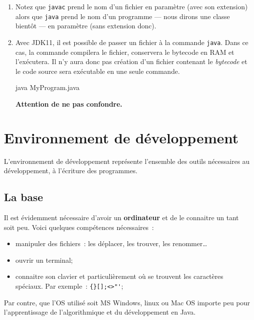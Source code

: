 \begin{enumerate}
	
	\item Notez que \texttt{javac} prend le nom d'un fichier en paramètre (avec
		son extension) alors que \texttt{java} prend le nom d'un programme
		— nous dirons une classe bientôt — en paramètre (sans extension donc). 

	\item Avec JDK11, il est possible de passer un fichier à la commande
		\texttt{java}. Dans ce cas, la commande compilera le fichier, conservera
		le bytecode en RAM et l'exécutera. Il n'y aura donc pas création d'un
		fichier contenant le \textit{bytecode} et le code source sera exécutable
		en une seule commande.  

		\begin{term}
			java MyProgram.java
		\end{term}

		\textbf{Attention de ne pas confondre.}

\end{enumerate}
 


%
%
%
%
\section{Environnement de développement}

L'environnement de développement représente l'ensemble des outils nécessaires au
développement, à l'écriture des programmes. 

\subsection{La base}

Il est évidemment nécessaire d'avoir un \textbf{ordinateur} et de le connaitre 
un tant soit peu. Voici quelques compétences nécessaires~:

\begin{itemize}
	\item manipuler des fichiers~: les déplacer, les trouver, les renommer…
	\item ouvrir un terminal;
	\item connaitre son clavier et particulièrement où se trouvent les caractères
		spéciaux. Par exemple~: \verb|{}[];<>"'|;

\end{itemize}

Par contre, que l'OS utilisé soit MS Windows, linux ou Mac OS importe peu pour 
l'apprentissage de l'algorithmique et du développement en Java. 


